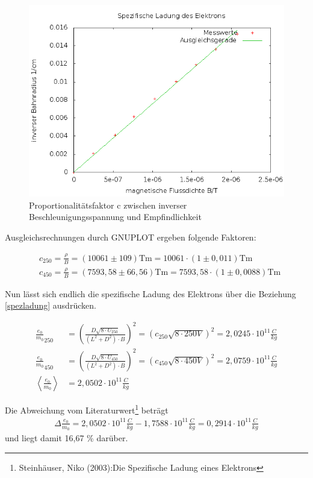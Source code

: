 \begin{figure}[htbp]
\includegraphics[width=1\textwidth] {pics/spezLadung.png}
\centering
\caption{Proportionalitätsfaktor c zwischen inverser Beschleunigungsspannung und Empfindlichkeit}
\end{figure}

Ausgleichsrechnungen durch GNUPLOT ergeben folgende Faktoren:

\begin{align}
& c_{250} = \frac{\rho}{B} = (10061 \pm 109) \text{Tm} = 10061\cdot(1 \pm 0,011) \text{Tm} \\
& c_{450} = \frac{\rho}{B} = (7593,58 \pm 66,56) \text{Tm} = 7593,58\cdot(1 \pm 0,0088) \text{Tm} 
\end{align}

Nun lässt sich endlich die spezifische Ladung des Elektrons über die Beziehung \eqref{spezladung} ausdrücken.

\begin{align}
\nonumber
\frac{e_0}{m_0}_{250} &= \left( \frac{D \sqrt{8\cdot U_{250}}}{(L^2+D^2)\cdot B} \right)^2 = (c_{250} \sqrt{8\cdot 250 V})^2 = 2,0245 \cdot 10^{11} \frac{C}{kg} \\
 \nonumber
 \frac{e_0}{m_0}_{450} &= \left( \frac{D \sqrt{8\cdot U_{450}}}{(L^2+D^2)\cdot B} \right)^2 = (c_{450} \sqrt{8\cdot 450 V})^2 = 2,0759 \cdot 10^{11} \frac{C}{kg} \\
 \left< \frac{e_0}{m_0} \right> &= 2,0502 \cdot 10^{11} \frac{C}{kg}
\end{align}

Die Abweichung vom Literaturwert\footnote{Steinhäuser, Niko (2003):Die Spezifische Ladung eines Elektrons} beträgt
\begin{align*}
\Delta \frac{e_0}{m_0} = 2,0502 \cdot 10^{11} \frac{C}{kg} - 1,7588 \cdot 10^{11} \frac{C}{kg} = 0,2914 \cdot 10^{11} \frac{C}{kg}
\end{align*}
und liegt damit 16,67 \% darüber.

